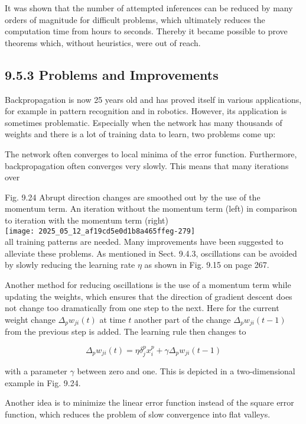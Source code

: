 \documentclass[10pt]{article}
\begin{document}
It was shown that the number of attempted inferences can be reduced by many orders of magnitude for difficult problems, which ultimately reduces the computation time from hours to seconds. Thereby it became possible to prove theorems which, without heuristics, were out of reach.

\subsection*{9.5.3 Problems and Improvements}
Backpropagation is now 25 years old and has proved itself in various applications, for example in pattern recognition and in robotics. However, its application is sometimes problematic. Especially when the network has many thousands of weights and there is a lot of training data to learn, two problems come up:

The network often converges to local minima of the error function. Furthermore, backpropagation often converges very slowly. This means that many iterations over

Fig. 9.24 Abrupt direction changes are smoothed out by the use of the momentum term. An iteration without the momentum term (left) in comparison to iteration with the momentum term (right)\\
\texttt{[image: 2025\_05\_12\_af19cd5e0d1b8a465ffeg-279]}\\
all training patterns are needed. Many improvements have been suggested to alleviate these problems. As mentioned in Sect. 9.4.3, oscillations can be avoided by slowly reducing the learning rate $\eta$ as shown in Fig. 9.15 on page 267.

Another method for reducing oscillations is the use of a momentum term while updating the weights, which ensures that the direction of gradient descent does not change too dramatically from one step to the next. Here for the current weight change $\Delta_{p} w_{j i}(t)$ at time $t$ another part of the change $\Delta_{p} w_{j i}(t-1)$ from the previous step is added. The learning rule then changes to

$$
\Delta_{p} w_{j i}(t)=\eta \delta_{j}^{p} x_{i}^{p}+\gamma \Delta_{p} w_{j i}(t-1)
$$

with a parameter $\gamma$ between zero and one. This is depicted in a two-dimensional example in Fig. 9.24.

Another idea is to minimize the linear error function instead of the square error function, which reduces the problem of slow convergence into flat valleys.
\end{document}
